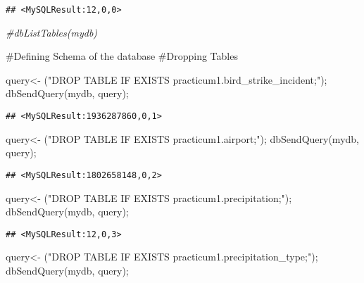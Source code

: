 \documentclass[
]{article}
\newenvironment{Shaded}{\begin{snugshade}}{\end{snugshade}}
\newcommand{\CommentTok}[1]{\textcolor[rgb]{0.56,0.35,0.01}{\textit{#1}}}
\newcommand{\FunctionTok}[1]{\textcolor[rgb]{0.00,0.00,0.00}{#1}}
\newcommand{\NormalTok}[1]{#1}
\newcommand{\OtherTok}[1]{\textcolor[rgb]{0.56,0.35,0.01}{#1}}
\newcommand{\StringTok}[1]{\textcolor[rgb]{0.31,0.60,0.02}{#1}}
\begin{document}
\begin{verbatim}
## <MySQLResult:12,0,0>
\end{verbatim}

\begin{Shaded}
\begin{Highlighting}[]
\CommentTok{\#dbListTables(mydb)}
\end{Highlighting}
\end{Shaded}

\#Defining Schema of the database \#Dropping Tables

\begin{Shaded}
\begin{Highlighting}[]
\NormalTok{query}\OtherTok{\textless{}{-}}\NormalTok{ (}\StringTok{"DROP TABLE IF EXISTS practicum1.\textasciigrave{}bird\_strike\_incident\textasciigrave{};"}\NormalTok{);}
\FunctionTok{dbSendQuery}\NormalTok{(mydb, query);}
\end{Highlighting}
\end{Shaded}

\begin{verbatim}
## <MySQLResult:1936287860,0,1>
\end{verbatim}

\begin{Shaded}
\begin{Highlighting}[]
\NormalTok{query}\OtherTok{\textless{}{-}}\NormalTok{ (}\StringTok{"DROP TABLE IF EXISTS practicum1.\textasciigrave{}airport\textasciigrave{};"}\NormalTok{);}
\FunctionTok{dbSendQuery}\NormalTok{(mydb, query);}
\end{Highlighting}
\end{Shaded}

\begin{verbatim}
## <MySQLResult:1802658148,0,2>
\end{verbatim}

\begin{Shaded}
\begin{Highlighting}[]
\NormalTok{query}\OtherTok{\textless{}{-}}\NormalTok{ (}\StringTok{"DROP TABLE IF EXISTS practicum1.\textasciigrave{}precipitation\textasciigrave{};"}\NormalTok{);}
\FunctionTok{dbSendQuery}\NormalTok{(mydb, query);}
\end{Highlighting}
\end{Shaded}

\begin{verbatim}
## <MySQLResult:12,0,3>
\end{verbatim}

\begin{Shaded}
\begin{Highlighting}[]
\NormalTok{query}\OtherTok{\textless{}{-}}\NormalTok{ (}\StringTok{"DROP TABLE IF EXISTS practicum1.\textasciigrave{}precipitation\_type\textasciigrave{};"}\NormalTok{);}
\FunctionTok{dbSendQuery}\NormalTok{(mydb, query);}
\end{Highlighting}
\end{Shaded}
\end{document}
